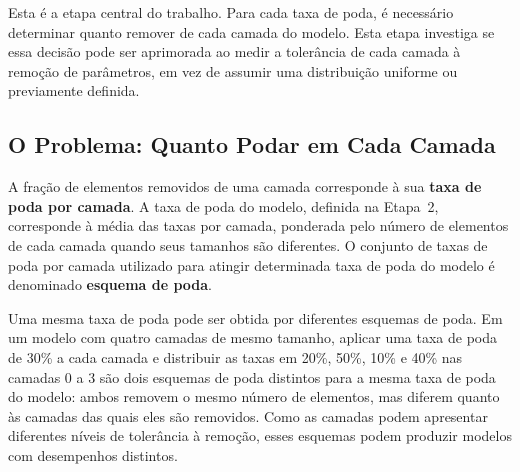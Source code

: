 Esta é a etapa central do trabalho. Para cada taxa de poda, é necessário determinar quanto
remover de cada camada do modelo. Esta etapa investiga se essa decisão pode ser aprimorada ao
medir a tolerância de cada camada à remoção de parâmetros, em vez de assumir uma
distribuição uniforme ou previamente definida.

\subsection{O Problema: Quanto Podar em Cada Camada}

A fração de elementos removidos de uma camada corresponde à sua \textbf{taxa de poda por
camada}. A taxa de poda do modelo, definida na Etapa~2, corresponde à média das taxas por
camada, ponderada pelo número de elementos de cada camada quando seus tamanhos são
diferentes. O conjunto de taxas de poda por camada utilizado para atingir determinada taxa
de poda do modelo é denominado \textbf{esquema de poda}.

Uma mesma taxa de poda pode ser obtida por diferentes esquemas de poda. Em um modelo com
quatro camadas de mesmo tamanho, aplicar uma taxa de poda de 30\% a cada camada e distribuir
as taxas em 20\%, 50\%, 10\% e 40\% nas camadas 0 a 3 são dois esquemas de poda distintos
para a mesma taxa de poda do modelo: ambos removem o mesmo número de elementos, mas diferem
quanto às camadas das quais eles são removidos. Como as camadas podem apresentar diferentes
níveis de tolerância à remoção, esses esquemas podem produzir modelos com desempenhos
distintos.

